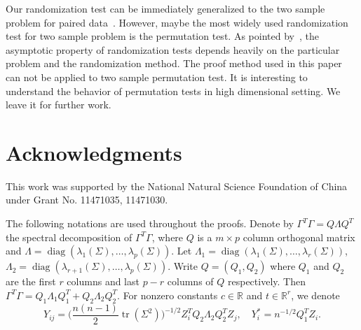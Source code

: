 \documentclass[3p]{elsarticle}
\DeclareMathOperator{\mytr}{tr}
\DeclareMathOperator{\mydiag}{diag}
\theoremstyle{plain}
\theoremstyle{definition}
\theoremstyle{remark}
\begin{document}
Our randomization test can be immediately generalized to the two sample problem for paired data~\citep{Konietschke2014}.
However, maybe the most widely used randomization test for two sample problem is the permutation test.
As pointed by~\citet{Romano1990On}, the asymptotic property of randomization tests depends heavily on the particular problem and the randomization method.
The proof method used in this paper can not be applied to two sample permutation test.
 It is interesting to understand the behavior of permutation tests in high dimensional setting. We leave it for further work.


\section*{Acknowledgments}
{This work was supported by the National Natural Science Foundation of China under Grant No. 11471035, 11471030.
}

\appendix
\appendixpage
    The following notations are used throughout the proofs.
    Denote by $\Gamma^T \Gamma= Q\Lambda Q^T$ the spectral decomposition of $\Gamma^T \Gamma$, where  $Q$ is a $m\times p$ column orthogonal matrix and $\Lambda=\mydiag(\lambda_1(\Sigma),\ldots,\lambda_p(\Sigma))$.
    Let $\Lambda_{1}=\mydiag(\lambda_1(\Sigma),\ldots,\lambda_r(\Sigma))$, $\Lambda_{2}=\mydiag(\lambda_{r+1}(\Sigma),\ldots,\lambda_p(\Sigma))$.
    Write $Q=(Q_{1},Q_{2})$ where $Q_{1}$ and $Q_{2}$ are the first $r$ columns and last $p-r$ columns of $Q$ respectively.
    Then $\Gamma^T \Gamma=Q_1\Lambda_1 Q_1^T + Q_2 \Lambda_2 Q_2^T$.
For nonzero constants $c\in\mathbb{R}$ and $t\in\mathbb{R}^r$, we denote
$$
    Y_{ij}=\big(\frac{n(n-1)}{2} \mytr(\Sigma^2)\big)^{-1/2}Z_i^T Q_2 \Lambda_2 Q_2^T Z_j,
    \quad
    Y^*_i=n^{-1/2} Q_1^T Z_i.
$$

\end{document}
